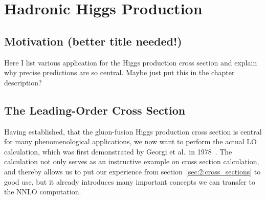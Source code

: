 
\chapter{Hadronic Higgs Production}\label{chap:three}

\section{Motivation (better title needed!)}
Here I list various application for the Higgs production cross section and explain why precise predictions are so central. Maybe just put this in the chapter description?
\section{The Leading-Order Cross Section}
Having established, that the gluon-fusion Higgs production cross section is central for many phenomenological applications, we now want to perform the actual \acs{LO} calculation, which was first demonstrated by Georgi et al.\ in 1978~\cite{Georgi:1977gs}. The calculation not only serves as an instructive example on cross section calculation, and thereby allows us to put our experience from section~\ref{sec:2:cross_sections} to good use, but it already introduces many important concepts we can transfer to the \acs{NNLO} computation.

